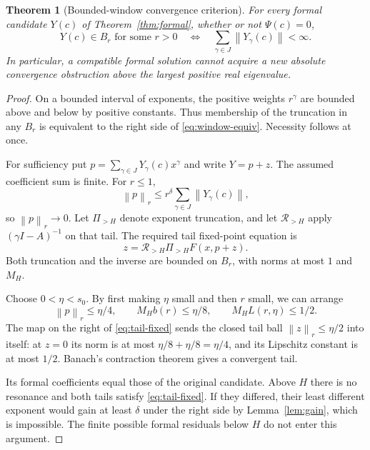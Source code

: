 \documentclass[11pt,a4paper]{article}
\numberwithin{equation}{section}
\newtheorem{theorem}{Theorem}[section]
\theoremstyle{definition}
\theoremstyle{remark}
\newcommand{\norm}[1]{\left\lVert #1\right\rVert}
\begin{document}
\begin{theorem}[Bounded-window convergence criterion]
\label{thm:window}
For every formal candidate $Y(c)$ of Theorem~\ref{thm:formal}, whether or
not $\Psi(c)=0$,
\begin{equation}\label{eq:window-equiv}
 Y(c)\in B_r\text{ for some }r>0
 \quad\Longleftrightarrow\quad
 \sum_{\gamma\in J}\norm{Y_\gamma(c)}<\infty.
\end{equation}
In particular, a compatible formal solution cannot acquire a new absolute
convergence obstruction above the largest positive real eigenvalue.
\end{theorem}
\begin{proof}
On a bounded interval of exponents, the positive weights $r^\gamma$ are
bounded above and below by positive constants. Thus membership of the
truncation in any $B_r$ is equivalent to the right side of
\eqref{eq:window-equiv}. Necessity follows at once.

For sufficiency put
$p=\sum_{\gamma\in J}Y_\gamma(c)x^\gamma$ and write $Y=p+z$.
The assumed coefficient sum is finite. For $r\leq1$,
\[
 \norm p_r\leq r^\delta\sum_{\gamma\in J}\norm{Y_\gamma(c)},
\]
so $\norm p_r\to0$. Let $\Pi_{>H}$ denote exponent truncation, and let
$\mathscr R_{>H}$ apply $(\gamma I-A)^{-1}$ on that tail.
The required tail fixed-point equation is
\begin{equation}\label{eq:tail-fixed}
 z=\mathscr R_{>H}\Pi_{>H}F(x,p+z).
\end{equation}
Both truncation and the inverse are bounded on $B_r$, with norms at most
$1$ and $M_H$.

Choose $0<\eta<s_0$. By first making $\eta$ small and then $r$ small,
we can arrange
\begin{equation}\label{eq:tail-conditions}
 \norm p_r\leq\eta/4,\qquad
 M_H b(r)\leq\eta/8,\qquad M_H L(r,\eta)\leq1/2.
\end{equation}
The map on the right of \eqref{eq:tail-fixed} sends the closed tail ball
$\norm z_r\leq\eta/2$ into itself: at $z=0$ its norm is at most
$\eta/8+\eta/8=\eta/4$, and its Lipschitz constant is at most $1/2$.
Banach's contraction theorem gives a convergent tail.

Its formal coefficients equal those of the original candidate. Above $H$
there is no resonance and both tails satisfy \eqref{eq:tail-fixed}.
If they differed, their least different exponent would gain at least
$\delta$ under the right side by Lemma~\ref{lem:gain}, which is impossible.
The finite possible formal residuals below $H$ do not enter this argument.
\end{proof}
\end{document}
